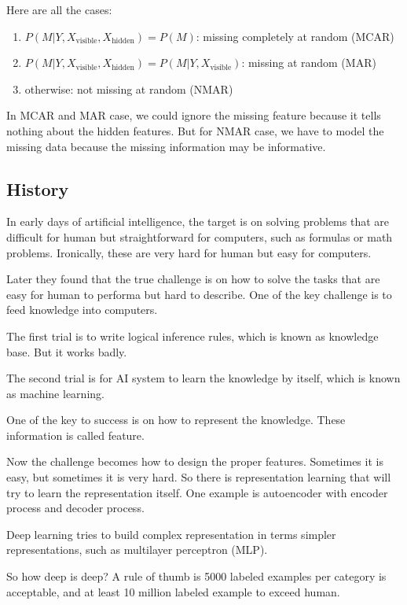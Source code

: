 Here are all the cases:
\begin{enumerate}
    \item $P(M|Y,X_{\text{visible}}, X_{\text{hidden}}) = P(M)$: missing completely at random (MCAR)
    \item $P(M|Y,X_{\text{visible}}, X_{\text{hidden}}) = P(M|Y,X_{\text{visible}})$: missing at random (MAR)
    \item otherwise: not missing at random (NMAR)
\end{enumerate}

In MCAR and MAR case, we could ignore the missing feature because it tells nothing about the hidden features. But for NMAR case, we have to model the missing data because the missing information may be informative.



\subsection{History}

In early days of artificial intelligence, the target is on solving problems that are difficult for human but straightforward for computers, such as formulas or math problems. Ironically, these are very hard for human but easy for computers.

Later they found that the true challenge is on how to solve the tasks that are easy for human to performa but hard to describe. One of the key challenge is to feed knowledge into computers.

The first trial is to write logical inference rules, which is known as knowledge base. But it works badly.

The second trial is for AI system to learn the knowledge by itself, which is known as machine learning.

One of the key to success is on how to represent the knowledge. These information is called feature.

Now the challenge becomes how to design the proper features. Sometimes it is easy, but sometimes it is very hard. So there is representation learning that will try to learn the representation itself. One example is autoencoder with encoder process and decoder process.

Deep learning tries to build complex representation in terms simpler representations, such as multilayer perceptron (MLP).

So how deep is deep? A rule of thumb is 5000 labeled examples per category is acceptable, and at least 10 million labeled example to exceed human.





























